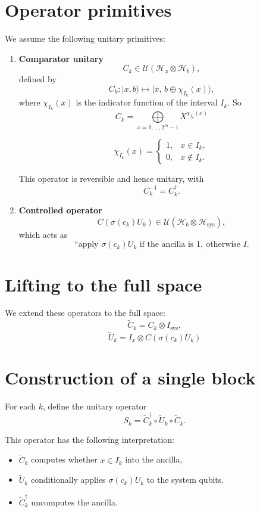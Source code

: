 \documentclass{article}
\begin{document}
\section*{Operator primitives}

We assume the following unitary primitives:

\begin{enumerate}
\item \textbf{Comparator unitary}
\[
C_k \in \mathcal{U}(\mathcal{H}_x \otimes \mathcal{H}_b),
\]
defined by
\[
C_k \colon | x,b \rangle \mapsto | x,\, b \oplus \chi_{I_k}(x) \rangle,
\]
where $\chi_{I_k}(x)$ is the indicator function of the interval $I_k$.
So
$$
C_k = \bigoplus\limits_{x = 0,\dots,2^m - 1} X^{\chi_{I_k}(x)}
$$

\[
\chi_{I_k}(x) =
\begin{cases}
1, & x \in I_k, \\
0, & x \notin I_k.
\end{cases}
\]

This operator is reversible and hence unitary, with
\[
C_k^{-1} = C_k^\dagger.
\]

\item \textbf{Controlled operator}
\[
 C(\sigma(c_k)U_k) \in \mathcal{U}(\mathcal{H}_b \otimes \mathcal{H}_{\mathrm{sys}}),
\]
which acts as
\[
\text{``apply } \sigma(c_k)U_k \text{ if the ancilla is } 1,\ \text{otherwise } I.
\]
\end{enumerate}

\section*{Lifting to the full space}

We extend these operators to the full space:
\[
\widetilde{C}_k = C_k \otimes I_{\mathrm{sys}},
\]
\[
\widetilde{U}_k = I_x \otimes C(\sigma(c_k)U_k)
\]

\section*{Construction of a single block}

For each $k$, define the unitary operator
\[
S_k
= \widetilde{C}_k^\dagger
\circ \widetilde{U}_k
\circ \widetilde{C}_k.
\]

This operator has the following interpretation:

\begin{itemize}
\item $\widetilde{C}_k$ computes whether $x \in I_k$ into the ancilla,
\item $\widetilde{U}_k$ conditionally applies $\sigma(c_k)U_k$ to the system qubits.
\item $\widetilde{C}_k^\dagger$ uncomputes the ancilla.
\end{itemize}
\end{document}
